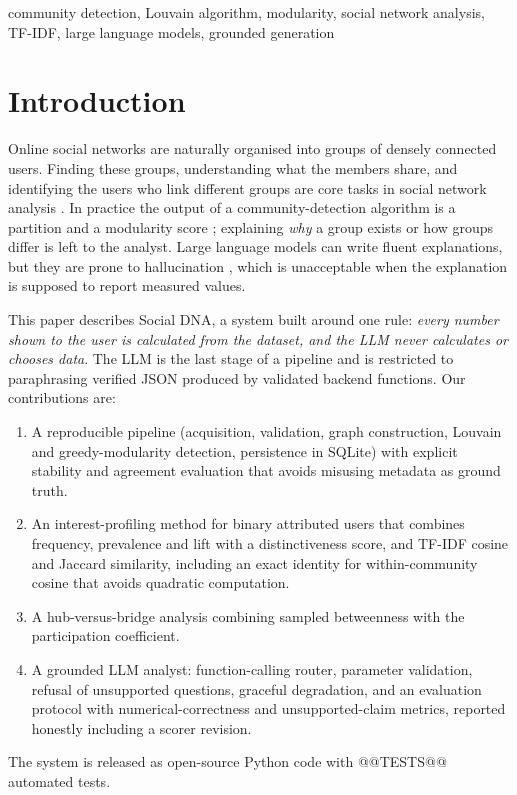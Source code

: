 \documentclass[conference]{IEEEtran}
\begin{document}
\begin{IEEEkeywords}
community detection, Louvain algorithm, modularity, social network analysis, TF-IDF, large language models, grounded generation
\end{IEEEkeywords}

\section{Introduction}
Online social networks are naturally organised into groups of densely connected users. Finding these groups, understanding what the members share, and identifying the users who link different groups are core tasks in social network analysis \cite{fortunato2010}. In practice the output of a community-detection algorithm is a partition and a modularity score \cite{newman2006}; explaining \emph{why} a group exists or how groups differ is left to the analyst. Large language models can write fluent explanations, but they are prone to hallucination \cite{ji2023}, which is unacceptable when the explanation is supposed to report measured values.

This paper describes Social DNA, a system built around one rule: \emph{every number shown to the user is calculated from the dataset, and the LLM never calculates or chooses data}. The LLM is the last stage of a pipeline and is restricted to paraphrasing verified JSON produced by validated backend functions. Our contributions are:
\begin{enumerate}
\item A reproducible pipeline (acquisition, validation, graph construction, Louvain and greedy-modularity detection, persistence in SQLite) with explicit stability and agreement evaluation that avoids misusing metadata as ground truth.
\item An interest-profiling method for binary attributed users that combines frequency, prevalence and lift with a distinctiveness score, and TF-IDF cosine and Jaccard similarity, including an exact identity for within-community cosine that avoids quadratic computation.
\item A hub-versus-bridge analysis combining sampled betweenness with the participation coefficient.
\item A grounded LLM analyst: function-calling router, parameter validation, refusal of unsupported questions, graceful degradation, and an evaluation protocol with numerical-correctness and unsupported-claim metrics, reported honestly including a scorer revision.
\end{enumerate}
The system is released as open-source Python code with @@TESTS@@ automated tests.
\end{document}
